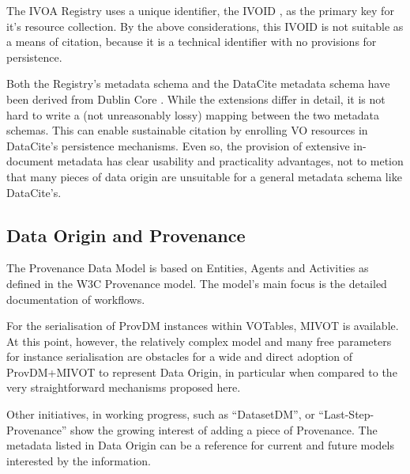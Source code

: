 \documentclass[11pt,a4paper]{ivoa}
\begin{document}
The IVOA Registry uses a unique identifier, the IVOID
\citep{2016ivoa.spec.0523D}, as the primary key for it's resource
collection.  By the above considerations, this IVOID is not suitable as a means of citation, because it is a technical identifier with no provisions for persistence.

Both the Registry's metadata schema and the DataCite
\citep{std:DataCite40} metadata schema have been
derived from Dublin Core \citep{std:DUBLINCORE}.  While the extensions differ in detail, it is not
hard to write a (not unreasonably lossy) mapping between the two metadata schemas.  This can enable
sustainable citation by enrolling VO resources in DataCite's persistence
mechanisms.  Even so, the provision of extensive in-document metadata
has clear usability and practicality advantages, not to metion that many
pieces of data origin are unsuitable for a general metadata schema like
DataCite's.

\subsection{Data Origin and Provenance}

The Provenance Data Model \citep{2020ivoa.spec.0411S} is based on Entities, Agents and Activities as defined in the W3C Provenance model. The model's main focus is the detailed documentation of workflows.

For the serialisation of ProvDM instances within VOTables, MIVOT \citep{2023ivoa.spec.0620M} is available.  At this point, however, the relatively complex model and many free parameters for instance serialisation are obstacles for a wide and direct adoption of ProvDM+MIVOT to represent Data Origin, in particular when compared to the very straightforward mechanisms proposed here.


Other initiatives, in working progress, such as ``DatasetDM'', or 
``Last-Step-Provenance'' show the growing interest of adding a piece of 
Provenance. The metadata listed in Data Origin can be a reference for current
and future models interested by the information.
\end{document}

